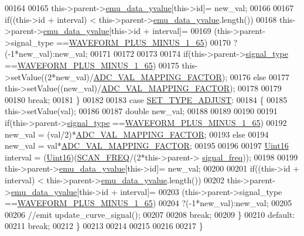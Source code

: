 \begin{DoxyCode}
00164 
00165         this->parent->\hyperlink{a00004_ad922d05d1e988d84f404c115fe909f72}{emu\_data\_yvalue}[this->id]= new\_val;
00166 
00167         \textcolor{keywordflow}{if}((this->\textcolor{keywordtype}{id} + interval) < this->parent->\hyperlink{a00004_ad922d05d1e988d84f404c115fe909f72}{emu\_data\_yvalue}.length())
00168         this->parent->\hyperlink{a00004_ad922d05d1e988d84f404c115fe909f72}{emu\_data\_yvalue}[this->id + interval]=
00169         (this->parent->signal\_type ==\hyperlink{a00034_a0923d3b365a36e1e8c401cec964aa36f}{WAVEFORM\_PLUS\_MINUS\_1\_65})
00170         ?(-1*new\_val):new\_val;
00171 
00172 
00173 
00174         \textcolor{keywordflow}{if}(this->parent->\hyperlink{a00004_a070edaec5aee6ba1f5a6866bc32c8ce4}{signal\_type} ==\hyperlink{a00034_a0923d3b365a36e1e8c401cec964aa36f}{WAVEFORM\_PLUS\_MINUS\_1\_65})
00175         this->setValue((2*new\_val)/\hyperlink{a00031_ada92d3eeeec0cbeee41e76a52d145792}{ADC\_VAL\_MAPPING\_FACTOR});
00176         \textcolor{keywordflow}{else}
00177         this->setValue((new\_val)/\hyperlink{a00031_ada92d3eeeec0cbeee41e76a52d145792}{ADC\_VAL\_MAPPING\_FACTOR});
00178 
00179 
00180     \textcolor{keywordflow}{break};
00181     \}
00182 
00183     \textcolor{keywordflow}{case} \hyperlink{a00034_a16b6b7b5ad68ec0dd62a3c9e97f88adb}{SET\_TYPE\_ADJUST}:
00184     \{
00185         this->setValue(val);
00186 
00187         \textcolor{keywordtype}{double} new\_val;
00188 
00189 
00190 
00191         \textcolor{keywordflow}{if}(this->parent->\hyperlink{a00004_a070edaec5aee6ba1f5a6866bc32c8ce4}{signal\_type} ==\hyperlink{a00034_a0923d3b365a36e1e8c401cec964aa36f}{WAVEFORM\_PLUS\_MINUS\_1\_65})
00192         new\_val = (val/2)*\hyperlink{a00031_ada92d3eeeec0cbeee41e76a52d145792}{ADC\_VAL\_MAPPING\_FACTOR};
00193         \textcolor{keywordflow}{else}
00194         new\_val = val*\hyperlink{a00031_ada92d3eeeec0cbeee41e76a52d145792}{ADC\_VAL\_MAPPING\_FACTOR};
00195 
00196 
00197         \hyperlink{a00001_aae7407b021d43f7193a81a58cfb3e297}{Uint16} interval = (\hyperlink{a00001_aae7407b021d43f7193a81a58cfb3e297}{Uint16})(\hyperlink{a00031_a8127170b687c1f67a968886c128e76e4}{SCAN\_FREQ}/(2*this->parent->
      \hyperlink{a00004_a67039999d520fc483fab521fae5ddde4}{signal\_freq}));
00198 
00199         this->parent->\hyperlink{a00004_ad922d05d1e988d84f404c115fe909f72}{emu\_data\_yvalue}[this->id]= new\_val;
00200 
00201         \textcolor{keywordflow}{if}((this->\textcolor{keywordtype}{id} + interval) < this->parent->\hyperlink{a00004_ad922d05d1e988d84f404c115fe909f72}{emu\_data\_yvalue}.length())
00202         this->parent->\hyperlink{a00004_ad922d05d1e988d84f404c115fe909f72}{emu\_data\_yvalue}[this->id + interval]=
00203         (this->parent->signal\_type ==\hyperlink{a00034_a0923d3b365a36e1e8c401cec964aa36f}{WAVEFORM\_PLUS\_MINUS\_1\_65})
00204         ?(-1*new\_val):new\_val;
00205 
00206         \textcolor{comment}{//emit update\_curve\_signal();}
00207 
00208     \textcolor{keywordflow}{break};
00209     \}
00210     \textcolor{keywordflow}{default}:
00211         \textcolor{keywordflow}{break};
00212     \}
00213 
00214 
00215 
00216 
00217 \}
\end{DoxyCode}


